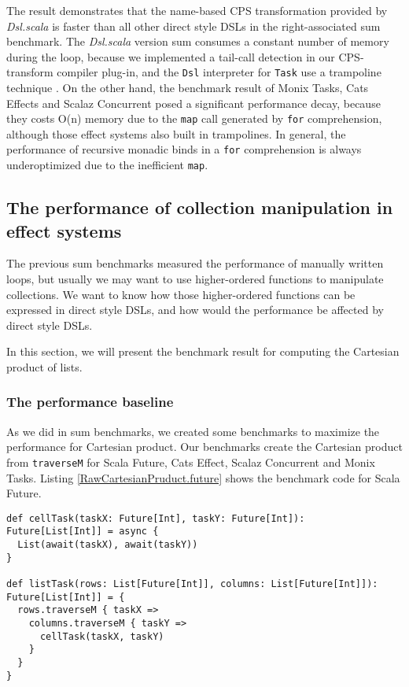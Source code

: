 The result demonstrates that the name-based CPS transformation provided by \textit{Dsl.scala} is faster than all other direct style DSLs in the right-associated sum benchmark. The \textit{Dsl.scala} version sum consumes a constant number of memory during the loop, because we implemented a tail-call detection in our CPS-transform compiler plug-in, and the \lstinline{Dsl} interpreter for \lstinline{Task} use a trampoline technique \cite{tarditi1992no}. On the other hand, the benchmark result of Monix Tasks, Cats Effects and Scalaz Concurrent posed a significant performance decay, because they costs O(n) memory due to the \lstinline{map} call generated by \lstinline{for} comprehension, although those effect systems also built in trampolines. In general, the performance of recursive monadic binds in a \lstinline{for} comprehension is always underoptimized due to the inefficient \lstinline{map}.

\subsection{The performance of collection manipulation in effect systems}

The previous sum benchmarks measured the performance of manually written loops, but usually we may want to use higher-ordered functions to manipulate collections. We want to know how those higher-ordered functions can be expressed in direct style DSLs, and how would the performance be affected by direct style DSLs.

In this section, we will present the benchmark result for computing the Cartesian product of lists.

\subsubsection{The performance baseline}

As we did in sum benchmarks, we created some benchmarks to maximize the performance for Cartesian product. Our benchmarks create the Cartesian product from \lstinline{traverseM} for Scala Future, Cats Effect, Scalaz Concurrent and Monix Tasks. Listing \ref{RawCartesianPruduct.future} shows the benchmark code for Scala Future.

\begin{lstlisting}[float=htbp,caption={Cartesian product for Scala Future, based on Scalaz's \lstinline{traverseM}},label={RawCartesianPruduct.future}]
def cellTask(taskX: Future[Int], taskY: Future[Int]): Future[List[Int]] = async {
  List(await(taskX), await(taskY))
}

def listTask(rows: List[Future[Int]], columns: List[Future[Int]]): Future[List[Int]] = {
  rows.traverseM { taskX =>
    columns.traverseM { taskY =>
      cellTask(taskX, taskY)
    }
  }
}
\end{lstlisting}

